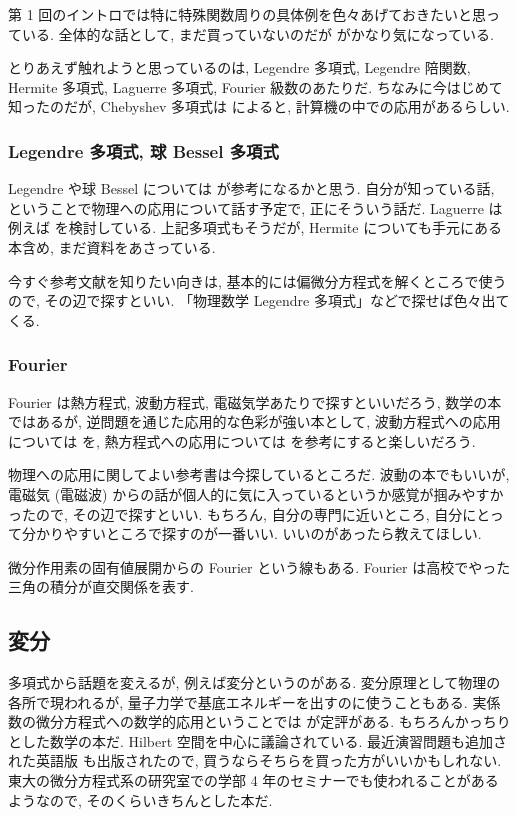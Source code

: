 \documentclass[openany, a4paper, oneside]{book}
\theoremstyle{break}
\theoremstyle{breakdefn}
\begin{document}
第 1 回のイントロでは特に特殊関数周りの具体例を色々あげておきたいと思っている.
全体的な話として, まだ買っていないのだが \cite{KazuhikoAomoto1} がかなり気になっている.

とりあえず触れようと思っているのは, Legendre 多項式, Legendre 陪関数,
Hermite 多項式, Laguerre 多項式, Fourier 級数のあたりだ.
ちなみに今はじめて知ったのだが, Chebyshev 多項式は \cite{HiroshiTanaka1} によると, 計算機の中での応用があるらしい.
\subsubsection{Legendre 多項式, 球 Bessel 多項式}
\label{sec-7-4-1-8-1}

Legendre や球 Bessel については \cite{NorikatsuMio1} が参考になるかと思う.
自分が知っている話, ということで物理への応用について話す予定で, 正にそういう話だ.
Laguerre は例えば \cite{KenichiKanaya1} を検討している.
上記多項式もそうだが, Hermite についても手元にある本含め, まだ資料をあさっている.

今すぐ参考文献を知りたい向きは, 基本的には偏微分方程式を解くところで使うので, その辺で探すといい.
「物理数学 Legendre 多項式」などで探せば色々出てくる.
\subsubsection{Fourier}
\label{sec-7-4-1-8-2}

Fourier は熱方程式, 波動方程式, 電磁気学あたりで探すといいだろう,
数学の本ではあるが, 逆問題を通じた応用的な色彩が強い本として,
波動方程式への応用については \cite{NoborizakaOnishiYamamoto1} を,
熱方程式への応用については \cite{KimYamamoto1} を参考にすると楽しいだろう.

物理への応用に関してよい参考書は今探しているところだ.
波動の本でもいいが, 電磁気 (電磁波) からの話が個人的に気に入っているというか感覚が掴みやすかったので,
その辺で探すといい.
もちろん, 自分の専門に近いところ, 自分にとって分かりやすいところで探すのが一番いい.
いいのがあったら教えてほしい.

微分作用素の固有値展開からの Fourier という線もある.
Fourier は高校でやった三角の積分が直交関係を表す.
\subsection{変分}
\label{sec-7-4-1-9}

多項式から話題を変えるが, 例えば変分というのがある.
変分原理として物理の各所で現われるが, 量子力学で基底エネルギーを出すのに使うこともある.
実係数の微分方程式への数学的応用ということでは \cite{HaimBrezis1} が定評がある.
もちろんかっちりとした数学の本だ.
Hilbert 空間を中心に議論されている.
最近演習問題も追加された英語版 \cite{HaimBrezis2} も出版されたので, 買うならそちらを買った方がいいかもしれない.
東大の微分方程式系の研究室での学部 4 年のセミナーでも使われることがあるようなので,
そのくらいきちんとした本だ.
\end{document}
